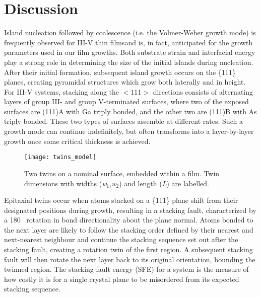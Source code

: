 \section{Discussion}
Island nucleation followed by coalescence (i.e. the Volmer-Weber growth mode) is frequently observed for III-V thin films\cite{Ernst1989,Fang1990,Kim2010,Akahane2004}and is, in fact, anticipated for the growth parameters used in our film growths. Both substrate strain and interfacial energy play a strong role in determining the size of the initial islands during nucleation. After their initial formation, subsequent island growth occurs on the \{111\} planes, creating pyramidal structures which grow both laterally and in height. For III-V systems, stacking along the $<$111$>$ directions consists of alternating layers of group III- and group V-terminated surfaces, where two of the exposed surfaces are (111)A with Ga triply bonded, and the other two are (111)B with As triply bonded. These two types of surfaces assemble at different rates. Such a growth mode can continue indefinitely, but often transforms into a layer-by-layer growth once some critical thickness is achieved\cite{Tersoff1994}.
\begin{figure}
    \centering
    \texttt{[image: twins\_model]}
    \caption[Model of twins on a (100) surface]{\label{fig:twins_model}Two twins on a nominal surface, embedded within a film. Twin dimensions with widths (\textit{w}$_1$,\textit{w}$_2$) and length (\textit{L}) are labelled.}
\end{figure}
Epitaxial twins occur when atoms stacked on a \{111\} plane shift from their designated positions during growth, resulting in a stacking fault, characterized by a 180\degree~ rotation in bond directionality about the plane normal. Atoms bonded to the next layer are likely to follow the stacking order defined by their nearest and next-nearest neighbour and continue the stacking sequence set out after the stacking fault, creating a rotation twin of the first region. A subsequent stacking fault will then rotate the next layer back to its original orientation, bounding the twinned region. The stacking fault energy (SFE) for a system is the measure of how costly it is for a single crystal plane to be misordered from its expected stacking sequence.

